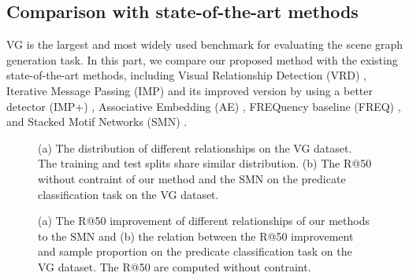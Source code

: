 \documentclass[10pt,twocolumn,letterpaper]{article}
\begin{document}
\subsection{Comparison with state-of-the-art methods}
VG \cite{krishna2017visual} is the largest and most widely used benchmark for evaluating the scene graph generation task. In this part, we compare our proposed method with the existing state-of-the-art methods, including Visual Relationship Detection (VRD) \cite{krishna2017visual}, Iterative Message Passing (IMP) \cite{xu2017scene} and its improved version by using a better detector (IMP+) \cite{xu2017scene,zellers2017neural}, Associative Embedding (AE) \cite{newell2017pixels}, FREQuency baseline (FREQ) \cite{zellers2017neural}, and Stacked Motif Networks (SMN) \cite{zellers2017neural}.

\begin{figure}[!t]
\centering
{}
\caption{(a) The distribution of different relationships on the VG dataset. The training and test splits share similar distribution. (b) The R@50 without contraint of our method and the SMN on the predicate classification task on the VG dataset.}
\end{figure}

\begin{figure}[htp]
\centering
{}
\caption{(a) The R@50 improvement of different relationships of our methods to the SMN and (b) the relation between the R@50 improvement and sample proportion on the predicate classification task on the VG dataset. The R@50 are computed without contraint.}
\end{figure}
\end{document}

